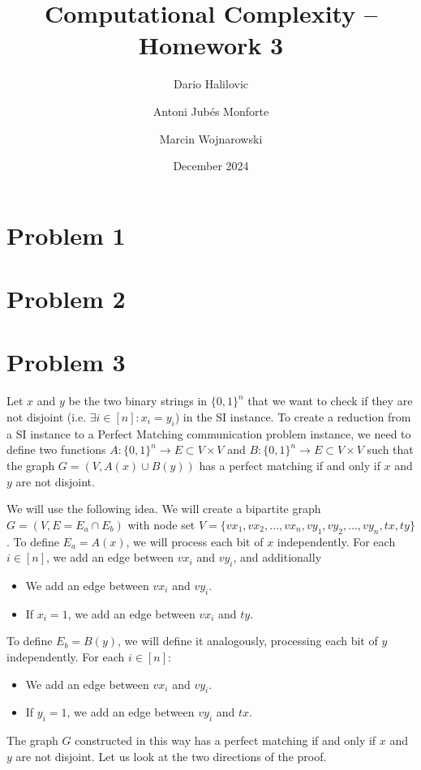 \documentclass{article}
\title{Computational Complexity -- Homework 3}
\author{Dario Halilovic\and
Antoni Jubés Monforte\and
Marcin Wojnarowski}
\date{December 2024}
\begin{document}
\maketitle

\section*{Problem 1}

\section*{Problem 2}

\section*{Problem 3}
Let $x$ and $y$ be the two binary strings in $\{0,1\}^n$ that we want to check if they are not disjoint (i.e. $\exists i \in [n]: x_i = y_i$) in the SI instance. To create a reduction from a SI instance to a Perfect Matching communication problem instance, we need to define two functions $A: \{0,1\}^n \to E \subset V \times V$ and $B: \{0,1\}^n \to E \subset V \times V$ such that the graph $G=(V,A(x)\cup B(y))$ has a perfect matching if and only if $x$ and $y$ are not disjoint.

We will use the following idea. We will create a bipartite graph $G = (V, E = E_a \cap E_b)$ with node set $V = \{vx_1, vx_2, \ldots, vx_n, vy_1, vy_2, \ldots, vy_n, tx, ty\}$. To define $E_a = A(x)$, we will process each bit of $x$ independently. For each $i\in [n]$, we add an edge between $vx_i$ and $vy_i$, and additionally

\begin{itemize}
    \item We add an edge between $vx_i$ and $vy_i$.
    \item If $x_i = 1$, we add an edge between $vx_i$ and $ty$.
\end{itemize}

To define $E_b = B(y)$, we will define it analogously, processing each bit of $y$ independently. For each $i\in [n]$:

\begin{itemize}
    \item We add an edge between $vx_i$ and $vy_i$.
    \item If $y_i = 1$, we add an edge between $vy_i$ and $tx$.
\end{itemize}

The graph $G$ constructed in this way has a perfect matching if and only if $x$ and $y$ are not disjoint. Let us look at the two directions of the proof.
\end{document}
